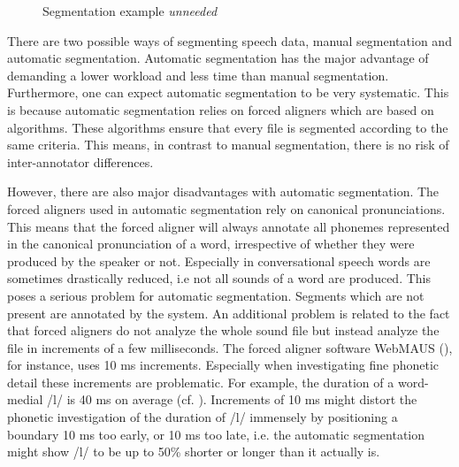 \begin{figure}[]
	
	\caption{Segmentation example \textit{unneeded}}
	\label{fig:segmentation unneeded}
\end{figure}

There are two possible ways of segmenting speech data, manual segmentation and automatic segmentation. Automatic segmentation has the major advantage of demanding a lower workload and less time than manual segmentation. Furthermore, one can expect automatic segmentation to be very systematic. This is because automatic segmentation relies on forced aligners which are based on algorithms. These algorithms ensure that every file is segmented according to the same criteria. This means, in contrast to manual segmentation, there is no risk of inter-annotator differences.

However, there are also major disadvantages with automatic segmentation. The forced aligners used in automatic segmentation rely on canonical pronunciations. This means that the forced aligner will always annotate all phonemes represented in the canonical pronunciation of a word, irrespective of whether they were produced by the speaker or not.  Especially in conversational speech words are sometimes drastically reduced, i.e not all sounds of a word are produced. This poses a serious problem for automatic segmentation. Segments which are not present are annotated by the system.
An additional problem is related to the fact that forced aligners do not analyze the whole sound file but instead analyze the file in increments of a few milliseconds. The forced aligner software WebMAUS (\citealt{Schiel.1999,Kisler.2016}), for instance, uses 10 ms increments. Especially when investigating fine phonetic detail these increments are problematic. For example, the duration of a word-medial /l/ is 40 ms on average (cf. \citealt{Umeda.1977}). Increments of 10 ms might distort the phonetic investigation of the duration of /l/ immensely by positioning a boundary 10 ms too early, or 10 ms too late, i.e. the automatic segmentation might show /l/ to be up to 50\% shorter or longer than it actually is.

